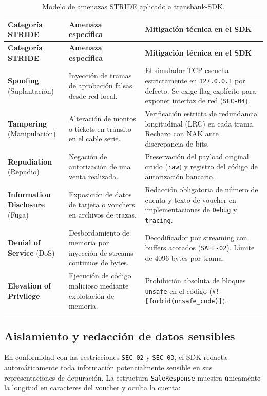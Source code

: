 \documentclass{../../plantilla/raysac-informe}
\begin{document}
\begin{longtable}{@{}p{2.8cm}p{4.2cm}p{6.8cm}@{}}
\caption{Modelo de amenazas STRIDE aplicado a transbank-SDK.}\label{tab:stride-resumen}\\
\toprule
\textbf{Categoría STRIDE} & \textbf{Amenaza específica} & \textbf{Mitigación técnica en el SDK} \\
\midrule
\endfirsthead
\toprule
\textbf{Categoría STRIDE} & \textbf{Amenaza específica} & \textbf{Mitigación técnica en el SDK} \\
\midrule
\endhead
\bottomrule
\endlastfoot
\textbf{Spoofing} (Suplantación) & Inyección de tramas de aprobación falsas desde red local. & El simulador TCP escucha estrictamente en \texttt{127.0.0.1} por defecto. Se exige flag explícito para exponer interfaz de red (\texttt{SEC-04}). \\
\textbf{Tampering} (Manipulación) & Alteración de montos o tickets en tránsito en el cable serie. & Verificación estricta de redundancia longitudinal (LRC) en cada trama. Rechazo con NAK ante discrepancia de bits. \\
\textbf{Repudiation} (Repudio) & Negación de autorización de una venta realizada. & Preservación del payload original crudo (\texttt{raw}) y registro del código de autorización bancario. \\
\textbf{Information Disclosure} (Fuga) & Exposición de datos de tarjeta o vouchers en archivos de trazas. & Redacción obligatoria de número de cuenta y texto de voucher en implementaciones de \texttt{Debug} y \texttt{tracing}. \\
\textbf{Denial of Service} (DoS) & Desbordamiento de memoria por inyección de streams continuos de bytes. & Decodificador por streaming con buffers acotados (\texttt{SAFE-02}). Límite de 4096 bytes por trama. \\
\textbf{Elevation of Privilege} & Ejecución de código malicioso mediante explotación de memoria. & Prohibición absoluta de bloques \texttt{unsafe} en el código (\texttt{\#![forbid(unsafe\_code)]}). \\
\end{longtable}

\subsection{Aislamiento y redacción de datos sensibles}
En conformidad con las restricciones \texttt{SEC-02} y \texttt{SEC-03}, el SDK redacta automáticamente
toda información potencialmente sensible en sus representaciones de depuración. La estructura
\texttt{SaleResponse} muestra únicamente la longitud en caracteres del voucher y oculta la cuenta:
\end{document}
